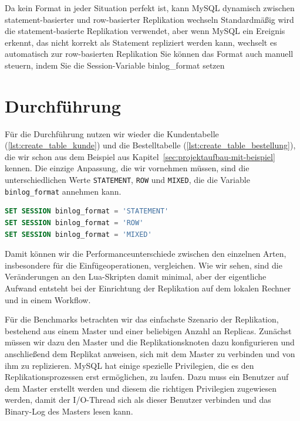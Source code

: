 Da kein Format in jeder Situation perfekt ist, kann MySQL dynamisch zwischen statement-basierter und row-basierter Replikation wechseln
Standardmäßig wird die statement-basierte Replikation verwendet, aber wenn MySQL ein Ereignis erkennt, das nicht korrekt als Statement repliziert werden kann, wechselt es automatisch zur row-basierten Replikation
Sie können das Format auch manuell steuern, indem Sie die Session-Variable binlog\_format setzen

\section{Durchführung}\label{sec:replication-durchfuhrung}

Für die Durchführung nutzen wir wieder die Kundentabelle (\ref{lst:create_table_kunde}) und die Bestelltabelle (\ref{lst:create_table_bestellung}), die wir schon aus dem Beispiel aus Kapitel~\ref{sec:projektaufbau-mit-beispiel} kennen.
Die einzige Anpassung, die wir vornehmen müssen, sind die unterschiedlichen Werte \texttt{STATEMENT}, \texttt{ROW} und \texttt{MIXED}, die die Variable \texttt{binlog\_format} annehmen kann.

\vspace{-5pt}
\begin{lstlisting}[language=SQL,caption=Unterschiedliche Formatimplementationen,label={lst:repl_change_format}]
SET SESSION binlog_format = 'STATEMENT'
SET SESSION binlog_format = 'ROW'
SET SESSION binlog_format = 'MIXED'
\end{lstlisting}
\vspace{-5pt}

Damit können wir die Performanceunterschiede zwischen den einzelnen Arten, insbesondere für die Einfügeoperationen, vergleichen.
Wie wir sehen, sind die Veränderungen an den Lua-Skripten damit minimal, aber der eigentliche Aufwand entsteht bei der Einrichtung der Replikation auf dem lokalen Rechner und in einem Workflow.

Für die Benchmarks betrachten wir das einfachste Szenario der Replikation, bestehend aus einem Master und einer beliebigen Anzahl an Replicas.
Zunächst müssen wir dazu den Master und die Replikationsknoten dazu konfigurieren und anschließend dem Replikat anweisen, sich mit dem Master zu verbinden und von ihm zu replizieren.
MySQL hat einige spezielle Privilegien, die es den Replikationsprozessen erst ermöglichen, zu laufen.
Dazu muss ein Benutzer auf dem Master erstellt werden und diesem die richtigen Privilegien zugewiesen werden, damit der I/O-Thread sich als dieser Benutzer verbinden und das Binary-Log des Masters lesen kann.

